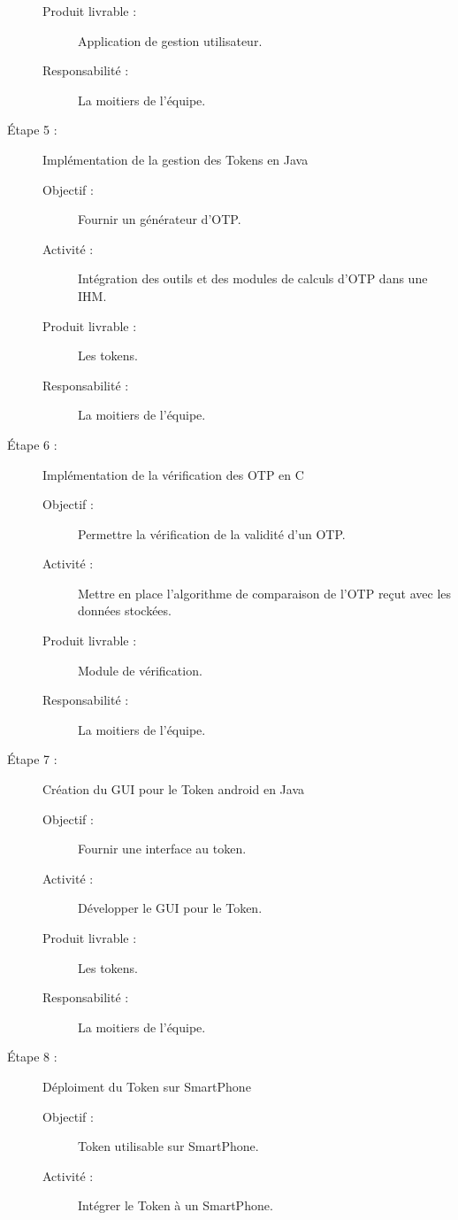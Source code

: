 \documentclass{../../res/univ-projet}
\begin{document}
\begin{description}
\begin{description}
		        \item [Produit livrable :] Application de gestion utilisateur.
		        \item [Responsabilité :] La moitiers de l'équipe.
		    \end{description}
	    \item [Étape 5 :] Implémentation de la gestion des Tokens en Java
		    \begin{description}
		        \item [Objectif :] Fournir un générateur d'OTP.
		        \item [Activité :] Intégration des outils et des modules de calculs d'OTP dans une IHM.
		        \item [Produit livrable :] Les tokens.
		        \item [Responsabilité :]  La moitiers de l'équipe.
		    \end{description}
	    \item [Étape 6 :] Implémentation de la vérification des OTP en C
		    \begin{description}
		        \item [Objectif :] Permettre la vérification de la validité d'un OTP.
		        \item [Activité :] Mettre en place l'algorithme de comparaison de l'OTP reçut avec les données stockées.
		        \item [Produit livrable :] Module de vérification.
		        \item [Responsabilité :] La moitiers de l'équipe.
	            \end{description}
	    \item [Étape 7 :] Création du GUI pour le Token android en Java
		    \begin{description}
		        \item [Objectif :] Fournir une interface au token.
		        \item [Activité :] Développer le GUI pour le Token.
		        \item [Produit livrable :] Les tokens.
		        \item [Responsabilité :]  La moitiers de l'équipe.
		    \end{description}
	    \item [Étape 8 :] Déploiment du Token sur SmartPhone
		    \begin{description}
		        \item [Objectif :] Token utilisable sur SmartPhone.
		        \item [Activité :] Intégrer le Token à un SmartPhone.

\end{description}
\end{description}
\end{document}
